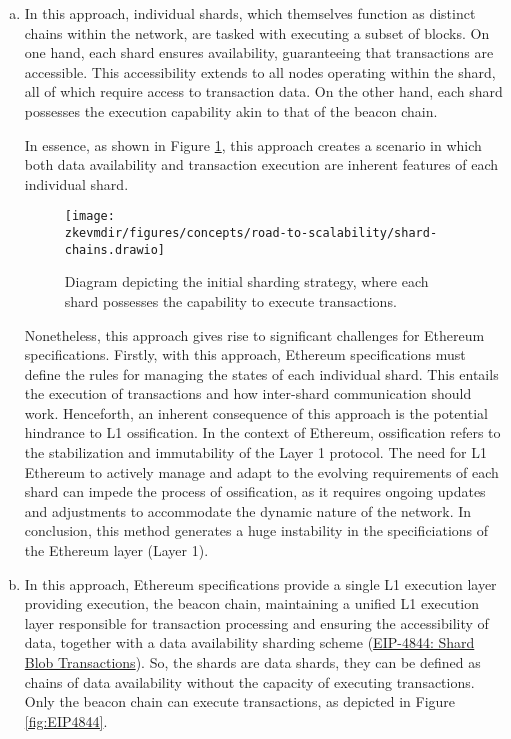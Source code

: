 \begin{enumerate}[(a)]

\item In this approach, individual shards, which themselves function as distinct chains within the network, are tasked with executing a subset of blocks. On one hand, each shard ensures availability, guaranteeing that transactions are accessible. This accessibility extends to all nodes operating within the shard, all of which require access to transaction data. On the other hand, each shard possesses the execution capability akin to that of the beacon chain.

In essence, as shown in Figure \ref{fig:sharding-chains}, this approach creates a scenario in which both data availability and transaction execution are inherent features of each individual shard.

\begin{figure}[H]
\centering
\texttt{[image: \\zkevmdir/figures/concepts/road-to-scalability/shard-chains.drawio]}
\caption{Diagram depicting the initial sharding strategy, where each shard possesses the capability to execute transactions.}
\label{fig:sharding-chains}
\end{figure}

Nonetheless, this approach gives rise to significant challenges for Ethereum specifications. Firstly, with this approach, Ethereum specifications must define the rules for managing the states of each individual shard. This entails the execution of transactions and how inter-shard communication should work. Henceforth, an inherent consequence of this approach is the potential hindrance to L1 ossification. In the context of Ethereum, ossification refers to the stabilization and immutability of the Layer 1 protocol. The need for L1 Ethereum to actively manage and adapt to the evolving requirements of each shard can impede the process of ossification, as it requires ongoing updates and adjustments to accommodate the dynamic nature of the network. In conclusion, this method generates a huge instability in the specificiations of the Ethereum layer (Layer 1).


\item In this approach, Ethereum specifications provide a single L1 execution layer providing execution, the beacon chain, maintaining a unified L1 execution layer responsible for transaction processing and ensuring the accessibility of data, together with a data availability sharding scheme (\href{https://eips.ethereum.org/EIPS/eip-4844}{EIP-4844: Shard Blob Transactions}). So, the shards are data shards, they can be defined as chains of data availability without the capacity of executing transactions. Only the beacon chain can execute transactions, as depicted in Figure \ref{fig:EIP4844}.


\end{enumerate}
